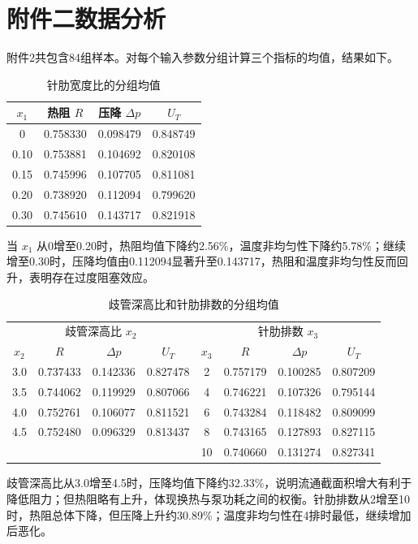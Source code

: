 \documentclass[UTF8,a4paper,12pt]{ctexart}
\begin{document}
\section{附件二数据分析}

附件2共包含84组样本。对每个输入参数分组计算三个指标的均值，结果如下。

\begin{table}[H]
\centering
\caption{针肋宽度比的分组均值}
\begin{tabular}{cccc}
\toprule
$x_1$ & 热阻 $R$ & 压降 $\Delta p$ & $U_T$\\
\midrule
0 & 0.758330 & 0.098479 & 0.848749\\
0.10 & 0.753881 & 0.104692 & 0.820108\\
0.15 & 0.745996 & 0.107705 & 0.811081\\
0.20 & 0.738920 & 0.112094 & 0.799620\\
0.30 & 0.745610 & 0.143717 & 0.821918\\
\bottomrule
\end{tabular}
\end{table}

当 $x_1$ 从0增至0.20时，热阻均值下降约2.56\%，温度非均匀性下降约5.78\%；继续增至0.30时，压降均值由0.112094显著升至0.143717，热阻和温度非均匀性反而回升，表明存在过度阻塞效应。

\begin{table}[H]
\centering
\caption{歧管深高比和针肋排数的分组均值}
\begin{tabular}{c|ccc|c|ccc}
\toprule
\multicolumn{4}{c|}{歧管深高比 $x_2$} & \multicolumn{4}{c}{针肋排数 $x_3$}\\
$x_2$ & $R$ & $\Delta p$ & $U_T$ & $x_3$ & $R$ & $\Delta p$ & $U_T$\\
\midrule
3.0 & 0.737433 & 0.142336 & 0.827478 & 2 & 0.757179 & 0.100285 & 0.807209\\
3.5 & 0.744062 & 0.119929 & 0.807066 & 4 & 0.746221 & 0.107326 & 0.795144\\
4.0 & 0.752761 & 0.106077 & 0.811521 & 6 & 0.743284 & 0.118482 & 0.809099\\
4.5 & 0.752480 & 0.096329 & 0.813437 & 8 & 0.743165 & 0.127893 & 0.827115\\
 & & & & 10 & 0.740660 & 0.131274 & 0.827341\\
\bottomrule
\end{tabular}
\end{table}

歧管深高比从3.0增至4.5时，压降均值下降约32.33\%，说明流通截面积增大有利于降低阻力；但热阻略有上升，体现换热与泵功耗之间的权衡。针肋排数从2增至10时，热阻总体下降，但压降上升约30.89\%；温度非均匀性在4排时最低，继续增加后恶化。
\end{document}
